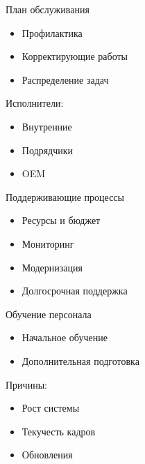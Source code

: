 \documentclass{beamer}
\begin{document}

\begin{frame}{План обслуживания}
\begin{itemize}
    \item Профилактика
    \item Корректирующие работы
    \item Распределение задач
\end{itemize}

\vspace{0.5cm}

Исполнители:
\begin{itemize}
    \item Внутренние
    \item Подрядчики
    \item OEM
\end{itemize}

\end{frame}


\begin{frame}{Поддерживающие процессы}
\begin{itemize}
    \item Ресурсы и бюджет
    \item Мониторинг
    \item Модернизация
    \item Долгосрочная поддержка
\end{itemize}

\end{frame}


\begin{frame}{Обучение персонала}
\begin{itemize}
    \item Начальное обучение
    \item Дополнительная подготовка
\end{itemize}

\vspace{0.5cm}

Причины:
\begin{itemize}
    \item Рост системы
    \item Текучесть кадров
    \item Обновления
\end{itemize}

\end{frame}
\end{document}
